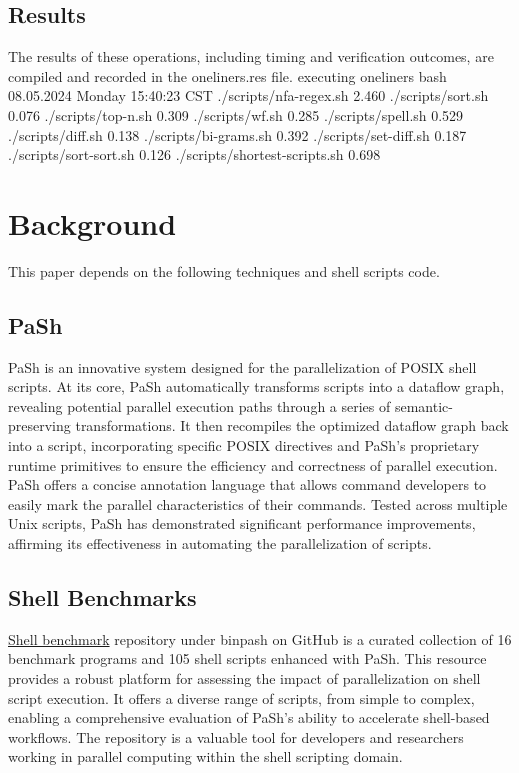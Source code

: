 \documentclass[sigplan, screen, 10pt]{acmart}
\begin{document}
\subsection{Results}
The results of these operations, including timing and verification outcomes, are compiled and recorded in the oneliners.res file.\newline
executing oneliners bash 08.05.2024 Monday 15:40:23 CST
./scripts/nfa-regex.sh 2.460 \newline
./scripts/sort.sh 0.076\newline
./scripts/top-n.sh 0.309\newline
./scripts/wf.sh 0.285\newline
./scripts/spell.sh 0.529\newline
./scripts/diff.sh 0.138\newline
./scripts/bi-grams.sh 0.392\newline
./scripts/set-diff.sh 0.187\newline
./scripts/sort-sort.sh 0.126\newline
./scripts/shortest-scripts.sh 0.698

\section{Background}
\label{bg}
This paper depends on the following techniques and shell scripts code.
\subsection{PaSh}
PaSh\cite{vasilakis2021pash} is an innovative system designed for the parallelization of POSIX shell scripts.
At its core, PaSh automatically transforms scripts into a dataflow graph, revealing potential parallel execution paths through a series of semantic-preserving transformations.
It then recompiles the optimized dataflow graph back into a script, incorporating specific POSIX directives and PaSh's proprietary runtime primitives to ensure the efficiency and correctness of parallel execution.
PaSh offers a concise annotation language that allows command developers to easily mark the parallel characteristics of their commands. 
Tested across multiple Unix scripts, PaSh has demonstrated significant performance improvements, affirming its effectiveness in automating the parallelization of scripts.
\subsection{Shell Benchmarks}
\href{https://github.com/binpash/benchmarks}{Shell benchmark} repository under binpash on GitHub is a curated collection of 16 benchmark programs and 105 shell scripts enhanced with PaSh. 
This resource provides a robust platform for assessing the impact of parallelization on shell script execution. 
It offers a diverse range of scripts, from simple to complex, enabling a comprehensive evaluation of PaSh's ability to accelerate shell-based workflows.
The repository is a valuable tool for developers and researchers working in parallel computing within the shell scripting domain.\newline
\end{document}
